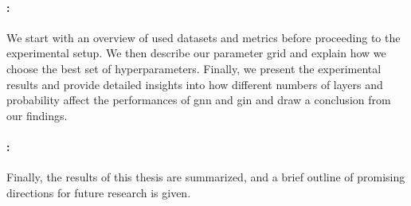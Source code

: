 \paragraph{: }
We start with an overview of used datasets and metrics before proceeding to the experimental setup.
We then describe our parameter grid and explain how we choose the best set of hyperparameters.
Finally, we present the experimental results and provide detailed insights into how different numbers of layers and probability affect the performances of \ac{gnn} and \ac{gin} and draw a conclusion from our findings.
\paragraph{: }
Finally, the results of this thesis are summarized, and a brief outline of promising directions for future research is given.
